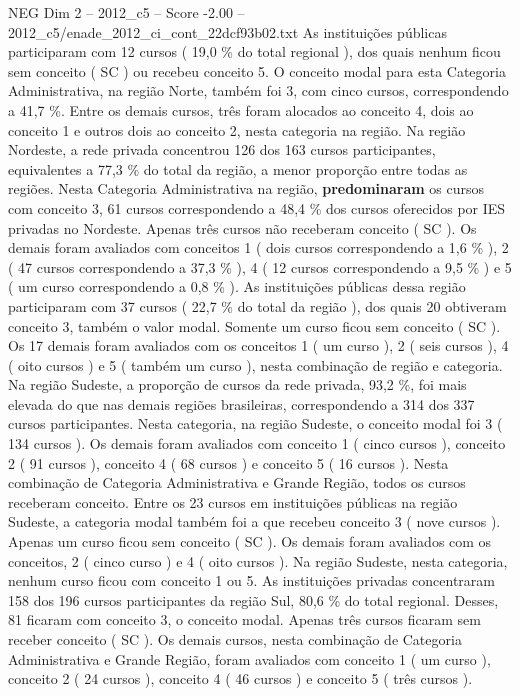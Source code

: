 \begin{textsample}{NEG Dim 2 – 2012\_c5 – Score -2.00 – 2012\_c5/enade\_2012\_ci\_cont\_22dcf93b02.txt}
As instituições públicas participaram com 12 cursos ( 19,0 \% do total regional ), dos quais nenhum ficou sem conceito ( SC ) ou recebeu conceito 5.
O conceito modal para esta Categoria Administrativa, na região Norte, também foi 3, com cinco cursos, correspondendo a 41,7 \%.
Entre os demais cursos, três foram alocados ao conceito 4, dois ao conceito 1 e outros dois ao conceito 2, nesta categoria na região.
Na região Nordeste, a rede privada concentrou 126 dos 163 cursos participantes, equivalentes a 77,3 \% do total da região, a menor proporção entre todas as regiões.
Nesta Categoria Administrativa na região, \textbf{predominaram} os cursos com conceito 3, 61 cursos correspondendo a 48,4 \% dos cursos oferecidos por IES privadas no Nordeste.
Apenas três cursos não receberam conceito ( SC ).
Os demais foram avaliados com conceitos 1 ( dois cursos correspondendo a 1,6 \% ), 2 ( 47 cursos correspondendo a 37,3 \% ), 4 ( 12 cursos correspondendo a 9,5 \% ) e 5 ( um curso correspondendo a 0,8 \% ).
As instituições públicas dessa região participaram com 37 cursos ( 22,7 \% do total da região ), dos quais 20 obtiveram conceito 3, também o valor modal.
Somente um curso ficou sem conceito ( SC ).
Os 17 demais foram avaliados com os conceitos 1 ( um curso ), 2 ( seis cursos ), 4 ( oito cursos ) e 5 ( também um curso ), nesta combinação de região e categoria.
Na região Sudeste, a proporção de cursos da rede privada, 93,2 \%, foi mais elevada do que nas demais regiões brasileiras, correspondendo a 314 dos 337 cursos participantes.
Nesta categoria, na região Sudeste, o conceito modal foi 3 ( 134 cursos ).
Os demais foram avaliados com conceito 1 ( cinco cursos ), conceito 2 ( 91 cursos ), conceito 4 ( 68 cursos ) e conceito 5 ( 16 cursos ).
Nesta combinação de Categoria Administrativa e Grande Região, todos os cursos receberam conceito.
Entre os 23 cursos em instituições públicas na região Sudeste, a categoria modal também foi a que recebeu conceito 3 ( nove cursos ).
Apenas um curso ficou sem conceito ( SC ).
Os demais foram avaliados com os conceitos, 2 ( cinco curso ) e 4 ( oito cursos ).
Na região Sudeste, nesta categoria, nenhum curso ficou com conceito 1 ou 5.
As instituições privadas concentraram 158 dos 196 cursos participantes da região Sul, 80,6 \% do total regional.
Desses, 81 ficaram com conceito 3, o conceito modal.
Apenas três cursos ficaram sem receber conceito ( SC ).
Os demais cursos, nesta combinação de Categoria Administrativa e Grande Região, foram avaliados com conceito 1 ( um curso ), conceito 2 ( 24 cursos ), conceito 4 ( 46 cursos ) e conceito 5 ( três cursos ).

\end{textsample}
